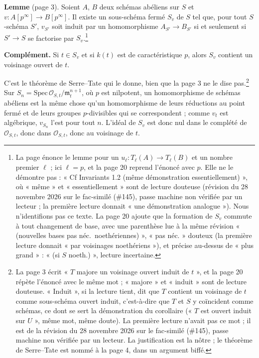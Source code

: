 \documentclass[11pt,a4paper]{article}
\begin{document}
\textbf{Lemme} (page 3). Soient $A$, $B$ deux schémas abéliens sur $S$ et
$v : A[p^\infty] \to B[p^\infty]$. Il existe un sous-schéma fermé $S_v$ de $S$
tel que, pour tout $S$-schéma $S'$, $v_{S'}$ soit induit par un homomorphisme
$A_{S'} \to B_{S'}$ si et seulement si $S' \to S$ se factorise par
$S_v$.\footnote{La page énonce le lemme pour un $u_\ell : T_\ell(A) \to
T_\ell(B)$ et un nombre premier $\ell$ ; ici $\ell = p$, et la page 20 reprend
l'énoncé avec $p$. Elle ne le démontre pas : « Cf Invariants 1.2
(même démonstration essentiellement) », où « même » et « essentiellement »
sont de lecture douteuse (révision du 28 novembre 2026 sur le fac-similé (\#145), passe machine non vérifiée par un lecteur ; la première lecture donnait « une
démonstration analogue »). Nous n'identifions pas ce texte. La page 20
ajoute que la formation de $S_v$ commute à tout changement de base, avec une
parenthèse lue à la même révision « (nouvelles bases pas néc.\
noethériennes) », « pas néc. » douteux (la première lecture donnait « par
voisinages noethériens »), et précise au-dessus de « plus grand » :
« (si $S$ noeth.) », lecture incertaine.}

\textbf{Complément.} Si $t \in S_v$ et si $k(t)$ est de caractéristique $p$,
alors $S_v$ contient un voisinage ouvert de $t$.

C'est le théorème de Serre--Tate qui le donne, bien que la page 3 ne le dise
pas.\footnote{La page 3 écrit « $T$ majore un voisinage ouvert induit de
$t$ », et la page 20 répète l'énoncé avec le même mot ; « majore » et
« induit » sont de lecture douteuse. « Induit », si la lecture tient, dit
que $T$ contient un voisinage de $t$ comme sous-schéma ouvert induit,
c'est-à-dire que $T$ et $S$ y coïncident comme schémas, ce dont se sert la
démonstration du corollaire (« $T$ est ouvert induit sur $U$ », même mot,
même doute). La première lecture n'avait pas ce mot ; il est de la
révision du 28 novembre 2026 sur le fac-similé (\#145), passe machine non vérifiée par un lecteur. La justification est la nôtre ; le théorème de
Serre--Tate est nommé à la page 4, dans un argument biffé.} Sur
$S_n = \mathrm{Spec}\,\mathcal{O}_{S,t}/\mathfrak{m}_t^{n+1}$, où $p$ est
nilpotent, un homomorphisme de schémas abéliens est la même chose qu'un
homomorphisme de leurs réductions au point fermé et de leurs groupes
$p$-divisibles qui se correspondent ; comme $v_t$ est algébrique, $v_{S_n}$
l'est pour tout $n$. L'idéal de $S_v$ est donc nul dans le complété de
$\mathcal{O}_{S,t}$, donc dans $\mathcal{O}_{S,t}$, donc au voisinage de $t$.
\end{document}

